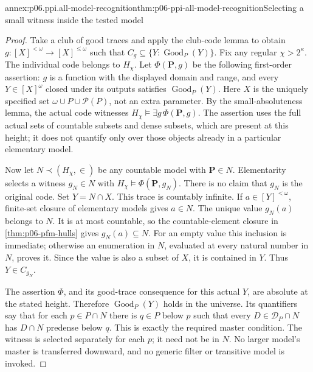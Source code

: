 \begin{annexitem}{annex:p06.ppi.all-model-recognition}{thm:p06-ppi-all-model-recognition}{Selecting a small witness inside the tested model}
\begin{proof}
Take a club of good traces and apply the club-code lemma to obtain
\(g:[X]^{<\omega}\to[X]^{\leq\omega}\) such that
\(C_g\subseteq\{Y:\operatorname{Good}_P(Y)\}\). Fix any regular
\(\chi>2^\kappa\). The individual code belongs to \(H_\chi\).
Let \(\Phi(\mathbf P,g)\) be the following first-order assertion:
\(g\) is a function with the displayed domain and range, and every
\(Y\in[X]^\omega\) closed under its outputs satisfies
\(\operatorname{Good}_P(Y)\). Here \(X\) is the uniquely specified
set \(\omega\cup P\cup\mathcal P(P)\), not an extra parameter.
By the small-absoluteness lemma, the actual code witnesses
\(H_\chi\models\exists g\,\Phi(\mathbf P,g)\). The assertion uses
the full actual sets of countable subsets and dense subsets, which are
present at this height; it does not quantify only over those objects
already in a particular elementary model.

Now let \(N\prec(H_\chi,\in)\) be any countable model with
\(\mathbf P\in N\). Elementarity selects a witness
\(g_N\in N\) with \(H_\chi\models\Phi(\mathbf P,g_N)\).
There is no claim that \(g_N\) is the original code. Set
\(Y=N\cap X\). This trace is countably infinite. If
\(a\in[Y]^{<\omega}\), finite-set closure of elementary models
gives \(a\in N\). The unique value \(g_N(a)\) belongs to \(N\).
It is at most countable, so the countable-element closure in
\cref{thm:p06-pfm-hulls} gives \(g_N(a)\subseteq N\).
For an empty value this inclusion is immediate; otherwise an
enumeration in \(N\), evaluated at every natural number in \(N\),
proves it. Since the value is also a subset of \(X\), it is contained
in \(Y\). Thus \(Y\in C_{g_N}\).

The assertion \(\Phi\), and its good-trace consequence for this
actual \(Y\), are absolute at the stated height. Therefore
\(\operatorname{Good}_P(Y)\) holds in the universe. Its quantifiers
say that for each \(p\in P\cap N\) there is \(q\in P\) below \(p\)
such that every \(D\in\mathcal D_P\cap N\) has \(D\cap N\)
predense below \(q\). This is exactly the required master condition.
The witness is selected separately for each \(p\); it need not be
in \(N\). No larger model's master is transferred downward, and no
generic filter or transitive model is invoked.
\end{proof}
\end{annexitem}


